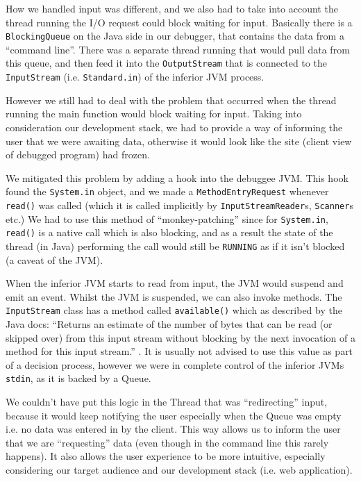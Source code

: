 \documentclass[11pt, a4paper]{article}
\begin{document}
How we handled input was different, and we also had to take into account the thread running the I/O request could block waiting for input.
Basically there is a \texttt{BlockingQueue} on the Java side in our debugger, that contains the data from a ``command line''.
There was a separate thread running that would pull data from this queue, and then feed it into the \texttt{OutputStream} that is connected to the \texttt{InputStream} (i.e. \texttt{Standard.in}) of the inferior JVM process.

However we still had to deal with the problem that occurred when the thread running the main function would block waiting for input.
Taking into consideration our development stack, we had to provide a way of informing the user that we were awaiting data, otherwise it would look like the site (client view of debugged program) had frozen.

We mitigated this problem by adding a hook into the debuggee JVM.
This hook found the \texttt{System.in} object, and we made a \texttt{MethodEntryRequest} whenever \texttt{read()} was called (which it is called implicitly by \texttt{InputStreamReader}s, \texttt{Scanner}s etc.)
We had to use this method of ``monkey-patching'' since for \texttt{System.in}, \texttt{read()} is a native call which is also blocking, and as a result the state of the thread (in Java) performing the call would still be \texttt{RUNNING} as if it isn't blocked (a caveat of the JVM).

When the inferior JVM starts to read from input, the JVM would suspend and emit an event.
Whilst the JVM is suspended, we can also invoke methods.
The \texttt{InputStream} class has a method called \texttt{available()} which as described by the Java docs: ``Returns an estimate of the number of bytes that can be read (or skipped over) from this input stream without blocking by the next invocation of a method for this input stream.'' \cite{java_available}. 
It is usually not advised to use this value as part of a decision process, however we were in complete control of the inferior JVMs \texttt{stdin}, as it is backed by a Queue.

We couldn't have put this logic in the Thread that was ``redirecting'' input, because it would keep notifying the user especially when the Queue was empty i.e. no data was entered in by the client.
This way allows us to inform the user that we are ``requesting'' data (even though in the command line this rarely happens).
It also allows the user experience to be more intuitive, especially considering our target audience and our development stack (i.e. web application).
\end{document}
